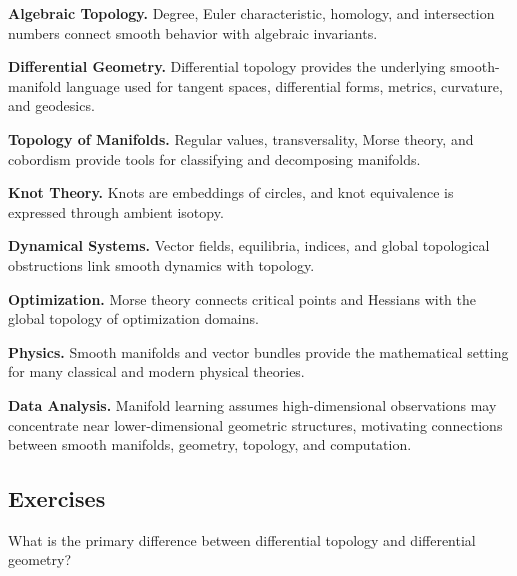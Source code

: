 \begin{applicationbox}
\textbf{Algebraic Topology.}
Degree, Euler characteristic, homology, and intersection numbers connect
smooth behavior with algebraic invariants.

\medskip

\textbf{Differential Geometry.}
Differential topology provides the underlying smooth-manifold language used
for tangent spaces, differential forms, metrics, curvature, and geodesics.

\medskip

\textbf{Topology of Manifolds.}
Regular values, transversality, Morse theory, and cobordism provide tools for
classifying and decomposing manifolds.

\medskip

\textbf{Knot Theory.}
Knots are embeddings of circles, and knot equivalence is expressed through
ambient isotopy.

\medskip

\textbf{Dynamical Systems.}
Vector fields, equilibria, indices, and global topological obstructions link
smooth dynamics with topology.

\medskip

\textbf{Optimization.}
Morse theory connects critical points and Hessians with the global topology
of optimization domains.

\medskip

\textbf{Physics.}
Smooth manifolds and vector bundles provide the mathematical setting for
many classical and modern physical theories.

\medskip

\textbf{Data Analysis.}
Manifold learning assumes high-dimensional observations may concentrate near
lower-dimensional geometric structures, motivating connections between
smooth manifolds, geometry, topology, and computation.
\end{applicationbox}

\subsection{Exercises}
\label{subsec:differential-topology-exercises}

\begin{exercise}[1]
What is the primary difference between differential topology and
differential geometry?
\end{exercise}

